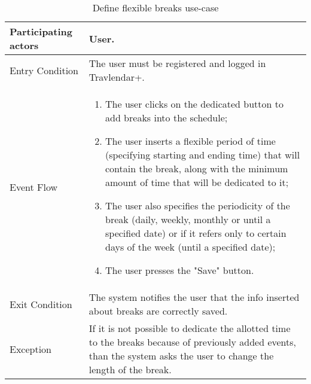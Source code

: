 \begin{table}[H]
	\begin{center}
		\begin{tabular}{ | p{} | p{} | }
		\hline
		Participating actors & User.\\
		\hline
		Entry Condition & The user must be registered and logged in Travlendar+.\\
		\hline
		Event Flow & 
			\begin{enumerate}
				\item The user clicks on the dedicated button to add breaks into the schedule;
				\item The user inserts a flexible period of time (specifying starting and ending time) that will contain the break, along with the minimum amount of time that will be dedicated to it;
				\item The user also specifies the periodicity of the break (daily, weekly, monthly or until a specified date) or if it refers only to certain days of the week (until a specified date);
				\item The user presses the "Save" button. 
			\end{enumerate} \\
		\hline
		Exit Condition &  The system notifies the user that the info inserted about breaks are correctly saved.\\
		\hline
		Exception & If it is not possible to dedicate the allotted time to the breaks because of previously added events, than the system asks the user to change the length of the break.
\\ 
		\hline
		\end{tabular}
	\end{center}
	\caption{Define flexible breaks use-case}
\end{table}